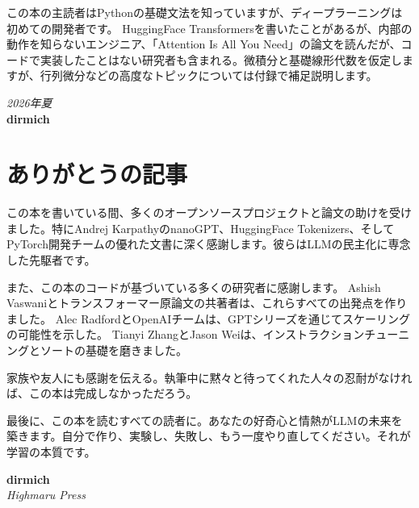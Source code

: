この本の主読者はPythonの基礎文法を知っていますが、ディープラーニングは初めての開発者です。 HuggingFace Transformersを書いたことがあるが、内部の動作を知らないエンジニア、「Attention Is All You Need」の論文を読んだが、コードで実装したことはない研究者も含まれる。微積分と基礎線形代数を仮定しますが、行列微分などの高度なトピックについては付録で補足説明します。

\begin{flushright}
\textit{2026年夏}\\[0.3em]
\textbf{dirmich}
\end{flushright}

\newpage

\section*{ありがとうの記事}

この本を書いている間、多くのオープンソースプロジェクトと論文の助けを受けました。特にAndrej KarpathyのnanoGPT、HuggingFace Tokenizers、そしてPyTorch開発チームの優れた文書に深く感謝します。彼らはLLMの民主化に専念した先駆者です。

また、この本のコードが基づいている多くの研究者に感謝します。 Ashish Vaswaniとトランスフォーマー原論文の共著者は、これらすべての出発点を作りました。 Alec RadfordとOpenAIチームは、GPTシリーズを通じてスケーリングの可能性を示した。 Tianyi ZhangとJason Weiは、インストラクションチューニングとソートの基礎を磨きました。

家族や友人にも感謝を伝える。執筆中に黙々と待ってくれた人々の忍耐がなければ、この本は完成しなかっただろう。

最後に、この本を読むすべての読者に。あなたの好奇心と情熱がLLMの未来を築きます。自分で作り、実験し、失敗し、もう一度やり直してください。それが学習の本質です。

\begin{flushright}
\textbf{dirmich}\\
\textit{Highmaru Press}
\end{flushright}
